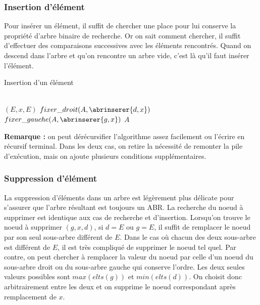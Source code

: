 \documentclass[../../../main.tex]{subfiles}
\begin{document}
\subsubsection{Insertion d'élément}
Pour insérer un élément, il suffit de chercher une place pour lui conserve la propriété d'arbre binaire de recherche. Or on sait comment chercher, il suffit d'effectuer des comparaisons successives avec les éléments rencontrés. Quand on descend dans l'arbre et qu'on rencontre un arbre vide, c'est là qu'il faut insérer l'élément.
\begin{algorithm}
\caption{Insertion d'un élément \label{alg:insertion_abr}}
\Indm\nonl{} \\
\Indp
{} {
	 {
		\Return $(E, x, E)$
	}
	 {
		 {
			$fixer\_droit(A, \abrinserer{d, x})$\;
		} {
			$fixer\_gauche(A, \abrinserer{g, x})$\;
		}
		\Return $A$
	}
}
\end{algorithm}
\textbf{Remarque :} on peut dérécursifier l'algorithme assez facilement ou l'écrire en récursif terminal. Dans les deux cas, on retire la nécessité de remonter la pile d'exécution, mais on ajoute plusieurs conditions supplémentaires.
\subsubsection{Suppression d'élément}
La suppression d'éléments dans un arbre est légèrement plus délicate pour s'assurer que l'arbre résultant est toujours un ABR. La recherche du noeud à supprimer est identique aux cas de recherche et d'insertion. Lorsqu'on trouve le noeud à supprimer $(g, x, d)$, si $d = E$ ou $g = E$, il suffit de remplacer le noeud par son seul sous-arbre différent de $E$. Dans le cas où chacun des deux sous-arbre est différent de $E$, il est très compliqué de supprimer le noeud tel quel. Par contre, on peut chercher à remplacer la valeur du noeud par celle d'un noeud du sous-arbre droit ou du sous-arbre gauche qui conserve l'ordre. Les deux seules valeurs possibles sont $max(elts(g))$ et $min(elts(d))$. On choisit donc arbitrairement entre les deux et on supprime le noeud correspondant après remplacement de $x$.
\end{document}

